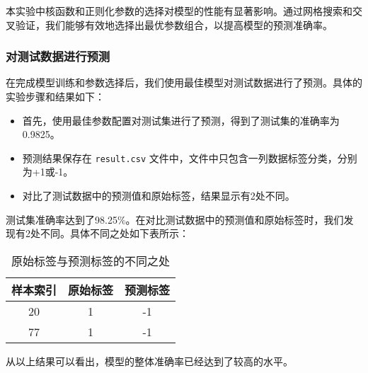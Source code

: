 \documentclass[12pt]{article}
\begin{document}
本实验中核函数和正则化参数的选择对模型的性能有显著影响。通过网格搜索和交叉验证，我们能够有效地选择出最优参数组合，以提高模型的预测准确率。
\subsubsection{对测试数据进行预测}

在完成模型训练和参数选择后，我们使用最佳模型对测试数据进行了预测。具体的实验步骤和结果如下：

\begin{itemize}
  \item 首先，使用最佳参数配置对测试集进行了预测，得到了测试集的准确率为0.9825。
  \item 预测结果保存在 \texttt{result.csv} 文件中，文件中只包含一列数据标签分类，分别为+1或-1。
  \item 对比了测试数据中的预测值和原始标签，结果显示有2处不同。
\end{itemize}




测试集准确率达到了98.25\%。在对比测试数据中的预测值和原始标签时，我们发现有2处不同。具体不同之处如下表所示：

\begin{table}[h]
  \centering
  \begin{tabular}{ccc}
    \toprule
    样本索引 & 原始标签 & 预测标签 \\
    \midrule
    20   & 1    & -1   \\
    77   & 1    & -1   \\
    \bottomrule
  \end{tabular}
  \caption{原始标签与预测标签的不同之处}
\end{table}

从以上结果可以看出，模型的整体准确率已经达到了较高的水平。
\end{document}
